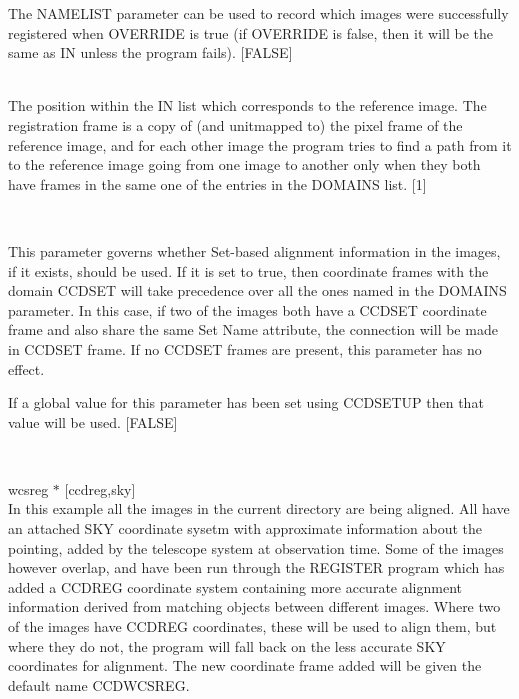\documentclass[twoside,11pt]{article}
\newcommand{\htmlref}[2]{#1}
\renewcommand{\_}{\texttt{\symbol{95}}}
\newcommand{\xroutine}[1]{\htmlref{{\sc #1}}{#1}}
\newcommand{\sstexamples}[1]{
   \item[Examples:] \mbox{} \\
   \vspace{-3.5ex}
   \begin{description}
      #1
   \end{description}
}
\newcommand{\sstsubsection}[1]{ \item[{#1}] \mbox{} \\}
\newcommand{\sstexamplesubsection}[2]{\sloppy \item{\ssttt #1} \mbox{} \\ #2 }
\newcommand{\sstexamples}[1]{
      \item[Examples:] \\
      \begin{description}
         #1
      \end{description}
      \\
   }
\newcommand{\sstsubsection}[1]{\item[{#1}]}
\newcommand{\sstexamplesubsection}[2]{\item[{\ssttt #1}] #2}
\begin{document}
{{{         The NAMELIST parameter can be used to record which images were
         successfully registered when OVERRIDE is true (if OVERRIDE is
         false, then it will be the same as IN unless the program fails).
         [FALSE]
      }
      \sstsubsection{ 
         REFPOS = \_INTEGER (Read)
      } {
         The position within the IN list which corresponds to the
         reference image.  The registration frame is a copy of (and
         unitmapped to) the pixel frame of the reference image,
         and for each other image the program tries to find a path from
         it to the reference image going from one image to another only
         when they both have frames in the same one of the entries in
         the DOMAINS list.
         [1]
      }
      \sstsubsection{
         USESET = \_LOGICAL (Read)
      } {
         This parameter governs whether Set-based alignment 
         information in the images, if it exists, should be used. 
         If it is set to true, then coordinate frames with the 
         domain CCD\_SET will take precedence over all the ones named 
         in the DOMAINS parameter.  In this case, if two of the images
         both have a CCD\_SET coordinate frame and also share the
         same Set Name attribute, the connection will be made in
         CCD\_SET frame.  If no CCD\_SET frames are present, this
         parameter has no effect.

         If a global value for this parameter has been set using 
         \xroutine{CCDSETUP} then that value will be used.
         [FALSE]
      }
   }
   \sstexamples{
      \sstexamplesubsection{
         wcsreg $*$ [ccd\_reg,sky]
      }{
         In this example all the images in the current directory are
         being aligned.  All have an attached SKY coordinate sysetm
         with approximate information about the pointing, added by the
         telescope system at observation time.  Some of the images
         however overlap, and have been run through the REGISTER
         program which has added a CCD\_REG coordinate system
         containing more accurate alignment information derived from
         matching objects between different images.  Where two of the
         images have CCD\_REG coordinates, these will be used to align
         them, but where they do not, the program will fall back on
         the less accurate SKY coordinates for alignment.  The new
         coordinate frame added will be given the default name
         CCD\_WCSREG.

}}}
\end{document}
